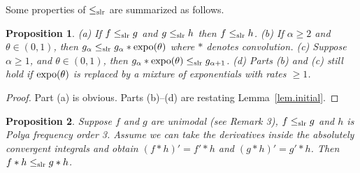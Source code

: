 \documentclass[11pt]{article}
\newtheorem{proposition}{\bf Proposition}
\begin{document}
Some properties of $\leq_{\rm slr}$ are summarized as follows.
\begin{proposition}
\label{slr.simple}
(a) If $f\leq_{\rm slr}g $ and $g\leq_{\rm slr} h$ then $f\leq_{\rm slr} h$.  (b) If $\alpha \geq 2$ 
and $\theta\in (0, 1)$, then $g_\alpha \leq_{\rm slr} g_\alpha * {\rm expo}(\theta)$ where $*$ denotes convolution. (c) Suppose $\alpha\geq 1$, and $\theta\in (0, 1)$, then $g_\alpha * {\rm expo}(\theta)\leq_{\rm slr} g_{\alpha+1}$. (d) Parts (b) and (c)  still hold if ${\rm expo}(\theta)$ is replaced by a mixture of exponentials with rates $\geq 1$. 
\end{proposition}
\begin{proof}
Part (a) is obvious.  Parts (b)--(d) are restating Lemma~\ref{lem.initial}.  %
\end{proof}
\begin{proposition}
\label{slr.prop}
Suppose $f$ and $g$ are unimodal (see Remark 3), $f\leq_{\rm slr} g$ and $h$ is Polya frequency order 3.  Assume we can take the derivatives inside the absolutely convergent integrals and obtain $(f* h)' = f' * h$ and $(g* h)' = g' * h$. Then $f*h \leq_{\rm slr} g*h$.
\end{proposition}
\end{document}
